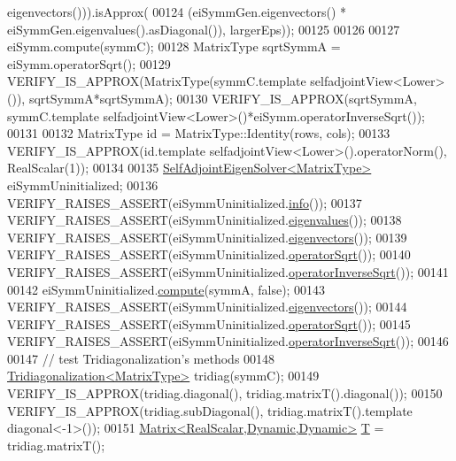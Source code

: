 \begin{DoxyCode}
      eigenvectors())).isApprox(
00124          (eiSymmGen.eigenvectors() * eiSymmGen.eigenvalues().asDiagonal()), largerEps));
00125 
00126 
00127   eiSymm.compute(symmC);
00128   MatrixType sqrtSymmA = eiSymm.operatorSqrt();
00129   VERIFY\_IS\_APPROX(MatrixType(symmC.template selfadjointView<Lower>()), sqrtSymmA*sqrtSymmA);
00130   VERIFY\_IS\_APPROX(sqrtSymmA, symmC.template selfadjointView<Lower>()*eiSymm.operatorInverseSqrt());
00131 
00132   MatrixType \textcolor{keywordtype}{id} = MatrixType::Identity(rows, cols);
00133   VERIFY\_IS\_APPROX(\textcolor{keywordtype}{id}.\textcolor{keyword}{template} selfadjointView<Lower>().operatorNorm(), RealScalar(1));
00134 
00135   \hyperlink{group___eigenvalues___module_class_eigen_1_1_self_adjoint_eigen_solver}{SelfAdjointEigenSolver<MatrixType>} eiSymmUninitialized;
00136   VERIFY\_RAISES\_ASSERT(eiSymmUninitialized.\hyperlink{group___eigenvalues___module_a56bd59b85a6f6f00ff7bff307ad0e015}{info}());
00137   VERIFY\_RAISES\_ASSERT(eiSymmUninitialized.\hyperlink{group___eigenvalues___module_a8efab27e82aa6aa0ae0c64739238c2e0}{eigenvalues}());
00138   VERIFY\_RAISES\_ASSERT(eiSymmUninitialized.\hyperlink{group___eigenvalues___module_a7b9f7e641fa46ac4c5f2371405c69b2b}{eigenvectors}());
00139   VERIFY\_RAISES\_ASSERT(eiSymmUninitialized.\hyperlink{group___eigenvalues___module_a5c5158fd86366081bdabec38112c2c8a}{operatorSqrt}());
00140   VERIFY\_RAISES\_ASSERT(eiSymmUninitialized.\hyperlink{group___eigenvalues___module_a71fe0aea0b22d176efcea556c5c160f5}{operatorInverseSqrt}());
00141 
00142   eiSymmUninitialized.\hyperlink{group___eigenvalues___module_a88bcdc24112efa7c4d2ebb3476efcbe9}{compute}(symmA, \textcolor{keyword}{false});
00143   VERIFY\_RAISES\_ASSERT(eiSymmUninitialized.\hyperlink{group___eigenvalues___module_a7b9f7e641fa46ac4c5f2371405c69b2b}{eigenvectors}());
00144   VERIFY\_RAISES\_ASSERT(eiSymmUninitialized.\hyperlink{group___eigenvalues___module_a5c5158fd86366081bdabec38112c2c8a}{operatorSqrt}());
00145   VERIFY\_RAISES\_ASSERT(eiSymmUninitialized.\hyperlink{group___eigenvalues___module_a71fe0aea0b22d176efcea556c5c160f5}{operatorInverseSqrt}());
00146 
00147   \textcolor{comment}{// test Tridiagonalization's methods}
00148   \hyperlink{group___eigenvalues___module_class_eigen_1_1_tridiagonalization}{Tridiagonalization<MatrixType>} tridiag(symmC);
00149   VERIFY\_IS\_APPROX(tridiag.diagonal(), tridiag.matrixT().diagonal());
00150   VERIFY\_IS\_APPROX(tridiag.subDiagonal(), tridiag.matrixT().template diagonal<-1>());
00151   \hyperlink{group___core___module_class_eigen_1_1_matrix}{Matrix<RealScalar,Dynamic,Dynamic>} \hyperlink{group___sparse_core___module}{T} = tridiag.matrixT();

\end{DoxyCode}

